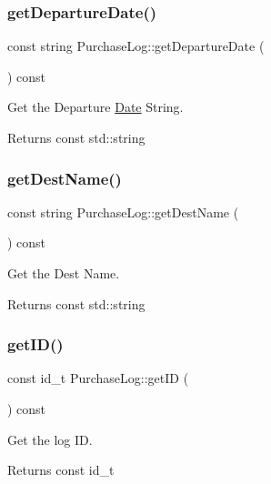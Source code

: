 \subsubsection{\texorpdfstring{get\+Departure\+Date()}{getDepartureDate()}}
{\footnotesize\ttfamily const string Purchase\+Log\+::get\+Departure\+Date (\begin{DoxyParamCaption}{ }\end{DoxyParamCaption}) const}



Get the Departure \mbox{\hyperlink{classDate}{Date}} String. 

\begin{DoxyReturn}{Returns}
const std\+::string 
\end{DoxyReturn}
\mbox{\label{classPurchaseLog_a1ced321455e51202b4fbc962a2ab4398}} 
\subsubsection{\texorpdfstring{get\+Dest\+Name()}{getDestName()}}
{\footnotesize\ttfamily const string Purchase\+Log\+::get\+Dest\+Name (\begin{DoxyParamCaption}{ }\end{DoxyParamCaption}) const}



Get the Dest Name. 

\begin{DoxyReturn}{Returns}
const std\+::string 
\end{DoxyReturn}
\mbox{\label{classPurchaseLog_a0320e9136e01de2a9652db55c1739d6f}} 
\subsubsection{\texorpdfstring{get\+I\+D()}{getID()}}
{\footnotesize\ttfamily const id\+\_\+t Purchase\+Log\+::get\+ID (\begin{DoxyParamCaption}{ }\end{DoxyParamCaption}) const}



Get the log ID. 

\begin{DoxyReturn}{Returns}
const id\+\_\+t 
\end{DoxyReturn}
\mbox{\label{classPurchaseLog_a53f354f530d3179139eff0dbcf7aa67b}} 
